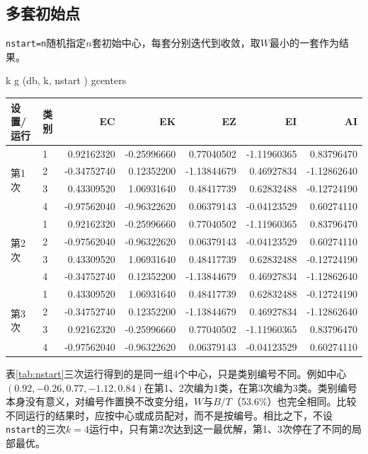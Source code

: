 \subsection{多套初始点}
\texttt{nstart=n}随机指定$n$套初始中心，每套分别迭代到收敛，取$W$最小的一套作为结果。
\begin{code}
k \ROperator{<-} 
g \ROperator{<-} (db, k, nstart \ROperator{=} )
g\ROperator{\$}centers
\end{code}
\par\addvspace{5pt}\begin{center}\begin{minipage}{\linewidth}\centering
\small
{}\label{tab:nstart}
\begin{tabular}{llrrrrr}\toprule
\textbf{设置/运行}&\textbf{类别}&\textbf{EC}&\textbf{EK}&\textbf{EZ}&\textbf{EI}&\textbf{AI}\\\midrule
\multirow{4}{*}{第1次} & 1 & 0.92162320 & -0.25996660 & 0.77040502 & -1.11960365 & 0.83796470\\
 & 2 & -0.34752740 & 0.12352200 & -1.13844679 & 0.46927834 & -1.12862640\\
 & 3 & 0.43309520 & 1.06931640 & 0.48417739 & 0.62832488 & -0.12724190\\
 & 4 & -0.97562040 & -0.96322620 & 0.06379143 & -0.04123529 & 0.60274110\\
\cmidrule(lr){1-7}
\multirow{4}{*}{第2次} & 1 & 0.92162320 & -0.25996660 & 0.77040502 & -1.11960365 & 0.83796470\\
 & 2 & -0.97562040 & -0.96322620 & 0.06379143 & -0.04123529 & 0.60274110\\
 & 3 & 0.43309520 & 1.06931640 & 0.48417739 & 0.62832488 & -0.12724190\\
 & 4 & -0.34752740 & 0.12352200 & -1.13844679 & 0.46927834 & -1.12862640\\
\cmidrule(lr){1-7}
\multirow{4}{*}{第3次} & 1 & 0.43309520 & 1.06931640 & 0.48417739 & 0.62832488 & -0.12724190\\
 & 2 & -0.34752740 & 0.12352200 & -1.13844679 & 0.46927834 & -1.12862640\\
 & 3 & 0.92162320 & -0.25996660 & 0.77040502 & -1.11960365 & 0.83796470\\
 & 4 & -0.97562040 & -0.96322620 & 0.06379143 & -0.04123529 & 0.60274110\\
\bottomrule\end{tabular}
\end{minipage}\end{center}
表\ref{tab:nstart}三次运行得到的是同一组4个中心，只是类别编号不同。例如中心$(0.92,\allowbreak-0.26,\allowbreak0.77,\allowbreak-1.12,\allowbreak0.84)$在第1、2次编为1类，在第3次编为3类。类别编号本身没有意义，对编号作置换不改变分组，$W$与$B/T$（53.6\%）也完全相同。比较不同运行的结果时，应按中心或成员配对，而不是按编号。相比之下，不设\texttt{nstart}的三次$k=4$运行中，只有第2次达到这一最优解，第1、3次停在了不同的局部最优。

